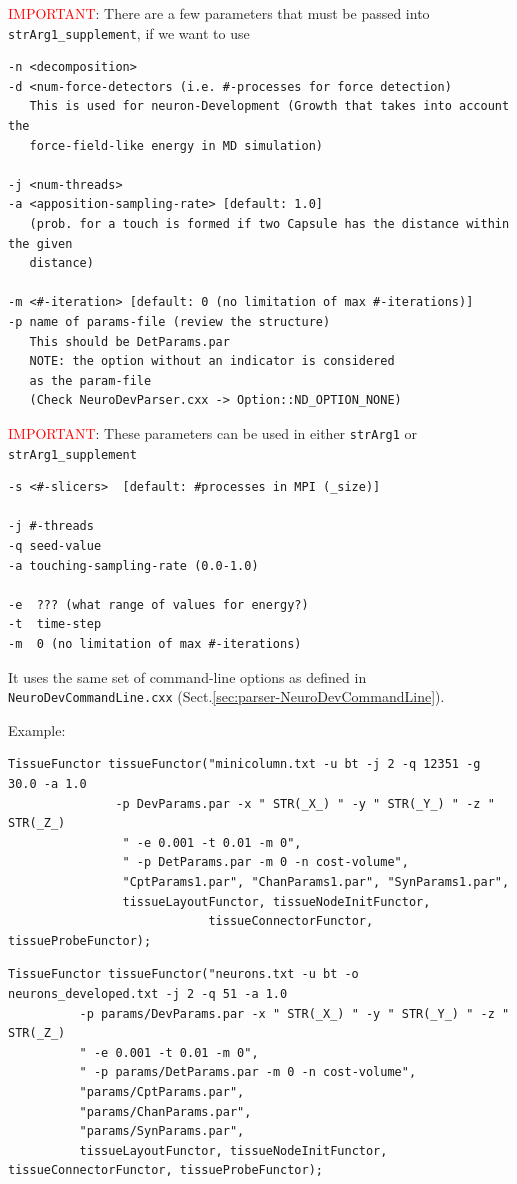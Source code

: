 \textcolor{red}{IMPORTANT}: There are a few parameters that must be passed into
\verb!strArg1_supplement!, if we want to use

{\small
\begin{verbatim}
-n <decomposition>
-d <num-force-detectors (i.e. #-processes for force detection)
   This is used for neuron-Development (Growth that takes into account the 
   force-field-like energy in MD simulation)

-j <num-threads>
-a <apposition-sampling-rate> [default: 1.0]
   (prob. for a touch is formed if two Capsule has the distance within the given
   distance)
    
-m <#-iteration> [default: 0 (no limitation of max #-iterations)]
-p name of params-file (review the structure)
   This should be DetParams.par
   NOTE: the option without an indicator is considered
   as the param-file
   (Check NeuroDevParser.cxx -> Option::ND_OPTION_NONE)

\end{verbatim}
}

\textcolor{red}{IMPORTANT}: These parameters can be used in either 
\verb!strArg1! or \verb!strArg1_supplement!

\begin{verbatim}
-s <#-slicers>  [default: #processes in MPI (_size)]
     
-j #-threads
-q seed-value
-a touching-sampling-rate (0.0-1.0)

-e  ??? (what range of values for energy?)
-t  time-step
-m  0 (no limitation of max #-iterations)
\end{verbatim}

It uses the same set of command-line options as defined in 
\verb!NeuroDevCommandLine.cxx! (Sect.\ref{sec:parser-NeuroDevCommandLine}).

Example:
{\tiny
\begin{verbatim}
TissueFunctor tissueFunctor("minicolumn.txt -u bt -j 2 -q 12351 -g 30.0 -a 1.0 
               -p DevParams.par -x " STR(_X_) " -y " STR(_Y_) " -z " STR(_Z_) 
			    " -e 0.001 -t 0.01 -m 0", 
			    " -p DetParams.par -m 0 -n cost-volume",
			    "CptParams1.par", "ChanParams1.par", "SynParams1.par",
			    tissueLayoutFunctor, tissueNodeInitFunctor, 
                            tissueConnectorFunctor, tissueProbeFunctor);
\end{verbatim}
}

{\tiny
\begin{verbatim}
TissueFunctor tissueFunctor("neurons.txt -u bt -o neurons_developed.txt -j 2 -q 51 -a 1.0 
          -p params/DevParams.par -x " STR(_X_) " -y " STR(_Y_) " -z " STR(_Z_) 
          " -e 0.001 -t 0.01 -m 0", 
          " -p params/DetParams.par -m 0 -n cost-volume",
          "params/CptParams.par", 
          "params/ChanParams.par", 
          "params/SynParams.par",
          tissueLayoutFunctor, tissueNodeInitFunctor, tissueConnectorFunctor, tissueProbeFunctor);
\end{verbatim}
}

